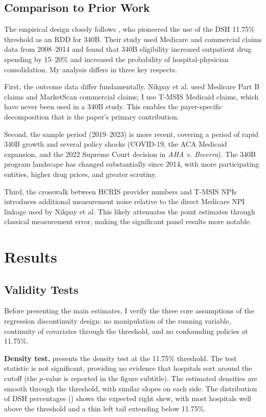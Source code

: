 \documentclass[12pt]{article}
\begin{document}
\subsection{Comparison to Prior Work}

The empirical design closely follows \citet{nikpay2018effect}, who pioneered the use of the DSH 11.75\% threshold as an RDD for 340B. Their study used Medicare and commercial claims data from 2008--2014 and found that 340B eligibility increased outpatient drug spending by 15--20\% and increased the probability of hospital-physician consolidation. My analysis differs in three key respects.

First, the outcome data differ fundamentally. Nikpay et al. used Medicare Part B claims and MarketScan commercial claims; I use T-MSIS Medicaid claims, which have never been used in a 340B study. This enables the payer-specific decomposition that is the paper's primary contribution.

Second, the sample period (2019--2023) is more recent, covering a period of rapid 340B growth and several policy shocks (COVID-19, the ACA Medicaid expansion, and the 2022 Supreme Court decision in \textit{AHA v. Becerra}). The 340B program landscape has changed substantially since 2014, with more participating entities, higher drug prices, and greater scrutiny.

Third, the crosswalk between HCRIS provider numbers and T-MSIS NPIs introduces additional measurement noise relative to the direct Medicare NPI linkage used by Nikpay et al. This likely attenuates the point estimates through classical measurement error, making the significant panel results more notable.


\section{Results}

\subsection{Validity Tests}

Before presenting the main estimates, I verify the three core assumptions of the regression discontinuity design: no manipulation of the running variable, continuity of covariates through the threshold, and no confounding policies at 11.75\%.

\textbf{Density test.}  presents the \citet{cattaneo2020simple} density test at the 11.75\% threshold. The test statistic is not significant, providing no evidence that hospitals sort around the cutoff (the $p$-value is reported in the figure subtitle). The estimated densities are smooth through the threshold, with similar slopes on each side. The distribution of DSH percentages () shows the expected right skew, with most hospitals well above the threshold and a thin left tail extending below 11.75\%.
\end{document}
